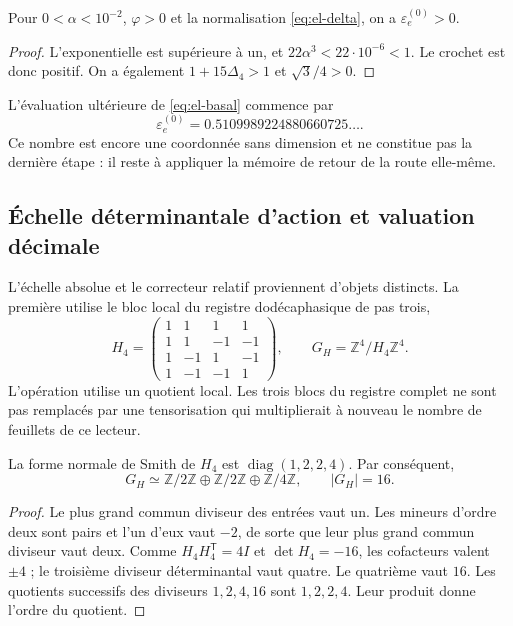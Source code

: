 \begin{proposition}
Pour \(0<\alpha<10^{-2}\), \(\varphi>0\) et la normalisation \eqref{eq:el-delta}, on a \(\varepsilon_e^{(0)}>0\).
\end{proposition}
\begin{proof}
L'exponentielle est supérieure à un, et
\(22\alpha^3<22\cdot10^{-6}<1\). Le crochet est donc positif.
On a également \(1+15\Delta_4>1\) et \(\sqrt3/4>0\).
\end{proof}

L'évaluation ultérieure de \eqref{eq:el-basal} commence par
\[
 \varepsilon_e^{(0)}=0.5109989224880660725\ldots.
\]
Ce nombre est encore une coordonnée sans dimension et ne constitue pas la dernière étape : il reste à appliquer la mémoire de retour de la route elle-même.

\subsection{Échelle déterminantale d'action et valuation décimale}

L'échelle absolue et le correcteur relatif proviennent d'objets
distincts. La première utilise le bloc local du registre dodécaphasique
de pas trois,
\begin{equation}
 H_4=\begin{pmatrix}
 1&1&1&1\\1&1&-1&-1\\1&-1&1&-1\\1&-1&-1&1
 \end{pmatrix},\qquad
 G_H=\mathbb Z^4/H_4\mathbb Z^4.
 \label{eq:el-h4}
\end{equation}
L'opération utilise un quotient local. Les trois blocs du registre
complet ne sont pas remplacés par une tensorisation qui multiplierait à
nouveau le nombre de feuillets de ce lecteur.

\begin{lemma}
La forme normale de Smith de \(H_4\) est
\(\operatorname{diag}(1,2,2,4)\). Par conséquent,
\[
 G_H\simeq\mathbb Z/2\mathbb Z\oplus\mathbb Z/2\mathbb Z
 \oplus\mathbb Z/4\mathbb Z,\qquad |G_H|=16.
\]
\end{lemma}
\begin{proof}
Le plus grand commun diviseur des entrées vaut un. Les mineurs d'ordre deux
sont pairs et l'un d'eux vaut \(-2\), de sorte que leur plus grand commun diviseur
vaut deux. Comme \(H_4H_4^{\mathsf T}=4I\) et \(\det H_4=-16\), les
cofacteurs valent \(\pm4\) ; le troisième diviseur déterminantal vaut quatre.
Le quatrième vaut \(16\). Les quotients successifs des diviseurs
\(1,2,4,16\) sont \(1,2,2,4\). Leur produit donne l'ordre du quotient.
\end{proof}

